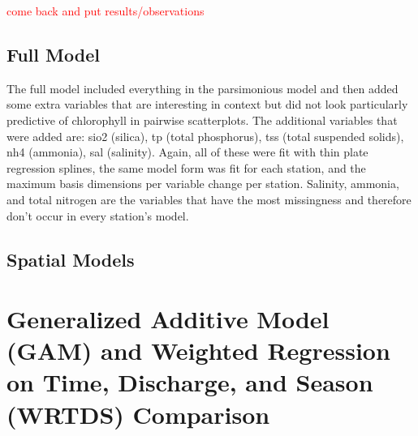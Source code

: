 \documentclass[12pt]{amsart}
\begin{document}
\textcolor{red}{come back and put results/observations}


\subsection{Full Model}

The full model included everything in the parsimonious model and then added some extra variables that are interesting in context but did not look particularly predictive of chlorophyll in pairwise scatterplots. The additional variables that were added are: sio2 (silica), tp (total phosphorus), tss (total suspended solids), nh4 (ammonia), sal (salinity). Again, all of these were fit with thin plate regression splines, the same model form was fit for each station, and the maximum basis dimensions per variable change per station.  Salinity, ammonia, and total nitrogen are the variables that have the most missingness and therefore don't occur in every station's model.




\subsection{Spatial Models}






\section{Generalized Additive Model (GAM) and Weighted Regression on Time, Discharge, and Season (WRTDS) Comparison}
\end{document}
